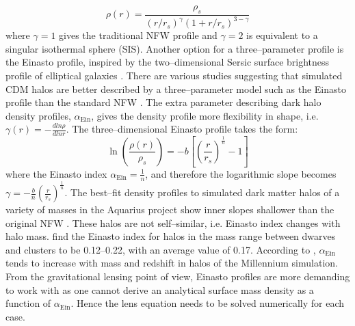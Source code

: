 \documentclass[paper=a4, fontsize=11pt]{scrartcl} %
\numberwithin{equation}{section} %
\numberwithin{figure}{section} %
\numberwithin{table}{section} %
\begin{document}
\begin{equation}
\rho(r) = \frac{\rho_s}{(r / r_s)^\gamma(1 + r/r_s)^{3-\gamma}} \nonumber
\end{equation}
where $\gamma = 1$ gives the traditional NFW profile and $\gamma = 2$ is equivalent to a singular isothermal sphere (SIS). Another option for a three--parameter profile is the Einasto profile, inspired by the two--dimensional Sersic surface brightness profile of elliptical galaxies \citep[][]{Einasto1965}. There are various studies suggesting that simulated CDM halos are better described by a three--parameter model such as the Einasto profile than the standard NFW \citep[e.g.][]{Navarro+2004, Gao+2008, DiCintio+2014, Dutton.Maccio2014}. The extra parameter describing dark halo density profiles, $\alpha_\mathrm{Ein}$, gives the density profile more flexibility in shape, i.e. $\gamma(r)=-\frac{dln\rho}{dlnr}$. The three--dimensional Einasto profile takes the form:
\begin{equation}
\ln\left(\frac{\rho(r)}{\rho_s}\right) = -b\left[\left(\frac{r}{r_s}\right)^{\frac{1}{n}} - 1\right] \nonumber
\end{equation}
where the Einasto index $\alpha_\mathrm{Ein} = \frac{1}{n}$, and therefore the logarithmic slope becomes $\gamma = -\frac{b}{n}(\frac{r}{r_s})^\frac{1}{n}$. The best--fit density profiles to simulated dark matter halos of a variety of masses in the Aquarius project show inner slopes shallower than the original NFW \citep{Navarro+2010}. These halos are not self--similar, i.e. Einasto index changes with halo mass. \citet{Navarro+2004} find the Einasto index for halos in the mass range between dwarves and clusters to be 0.12--0.22, with an average value of 0.17. According to \citet{Hayashi.White2008, Gao+2008}, $\alpha_\mathrm{Ein}$ tends to increase with mass and redshift in halos of the Millennium simulation. From the gravitational lensing point of view, Einasto profiles are more demanding to work with as one cannot derive an analytical surface mass density as a function of $\alpha_\mathrm{Ein}$. Hence the lens equation needs to be solved numerically for each case.


\end{document}
